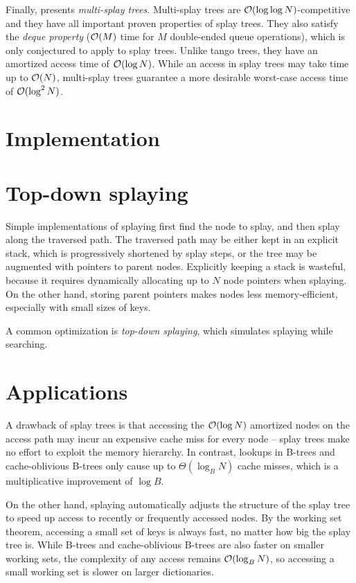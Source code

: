 Finally, \cite{multisplay-trees} presents \emph{multi-splay trees}.
Multi-splay trees are $\mathcal{O}(\log\log N)$-competitive and they have all important
proven properties of splay trees. They also satisfy the \emph{deque property}
($\mathcal{O}(M)$ time for $M$ double-ended queue operations), which is only conjectured
to apply to splay trees.
Unlike tango trees, they have an amortized access time of $\mathcal{O}(\log N)$.
While an access in splay trees may take time up to $\mathcal{O}(N)$, multi-splay trees
guarantee a more desirable worst-case access time of $\mathcal{O}(\log^2 N)$.
\section{Implementation}

\section{Top-down splaying}
Simple implementations of splaying first find the node to splay, and then
splay along the traversed path. The traversed path may be either kept
in an explicit stack, which is progressively shortened by splay steps,
or the tree may be augmented with pointers to parent nodes.
Explicitly keeping a stack is wasteful, because it requires dynamically
allocating up to $N$ node pointers when splaying. On the other hand,
storing parent pointers makes nodes less memory-efficient, especially
with small sizes of keys.

A common optimization is \emph{top-down splaying}, which simulates
splaying while searching.

\section{Applications}
A drawback of splay trees is that accessing the $\mathcal{O}(\log N)$ amortized
nodes on the access path may incur an expensive cache miss for every node --
splay trees make no effort to exploit the memory hierarchy.
In contrast, lookups in B-trees and cache-oblivious B-trees
only cause up to $\Theta(\log_B N)$ cache misses, which is a multiplicative
improvement of $\log B$.

On the other hand, splaying automatically adjusts the structure of the splay
tree to speed up access to recently or frequently accessed nodes. By the
working set theorem, accessing a small set of keys is always fast, no matter
how big the splay tree is. While B-trees and cache-oblivious B-trees are
also faster on smaller working sets, the complexity of any access remains
$\mathcal{O}(\log_B N)$, so accessing a small working set is slower on larger
dictionaries.

